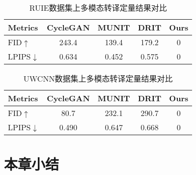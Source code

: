 \begin{table}[htb]
  \centering\small
  \caption{RUIE数据集上多模态转译定量结果对比}
  \label{tab:ruie_metric}
  \begin{tabular}{l|cccc}
    \toprule
    Metrics & CycleGAN & MUNIT & DRIT & Ours               \\
    \midrule
    FID$\uparrow$     & 243.4 & 139.4 & 179.2 & 0 \\ %
    LPIPS$\downarrow$ & 0.634 & 0.452 & 0.575 & 0 \\
    \bottomrule
  \end{tabular}
\end{table}

\begin{table}[htb]
  \centering\small
  
  \caption{UWCNN数据集上多模态转译定量结果对比}
  \label{tab:uwcnn_metric}
  \begin{tabular}{l|cccc}
    \toprule
    Metrics & CycleGAN & MUNIT & DRIT & Ours               \\
    \midrule
    FID$\uparrow$     & 80.7  & 232.1 & 290.7 & 0 \\ %
    LPIPS$\downarrow$ & 0.490 & 0.647 & 0.668 & 0 \\
    \bottomrule
  \end{tabular}
\end{table}


\section{本章小结}
